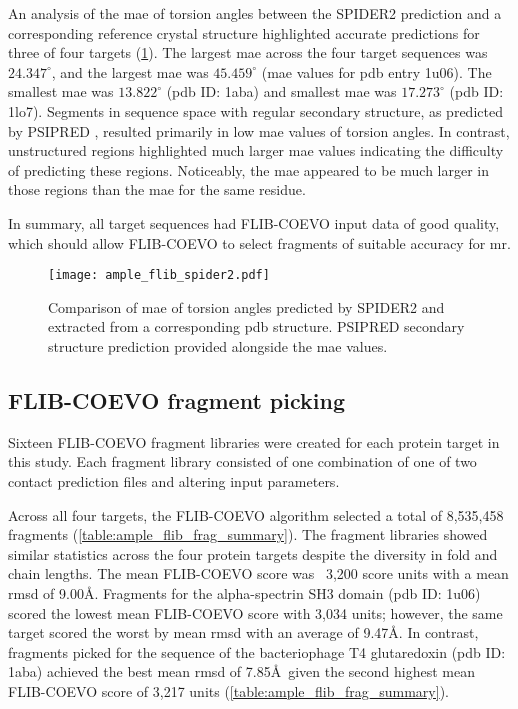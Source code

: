 An analysis of the \gls{mae} of torsion angles between the SPIDER2 \cite{Heffernan2015-bt} prediction and a corresponding reference crystal structure highlighted accurate predictions for three of four targets (\cref{fig:ample_flib_spider2}). The largest \gls{mae}\textsubscript{\textphi} across the four target sequences was $24.347^{\circ}$, and the largest \gls{mae}\textsubscript{\textpsi} was $45.459^{\circ}$ (\gls{mae} values for \gls{pdb} entry 1u06). The smallest \gls{mae}\textsubscript{\textphi} was $13.822^{\circ}$ (\gls{pdb} ID: 1aba) and smallest \gls{mae}\textsubscript{\textpsi} was $17.273^{\circ}$ (\gls{pdb} ID: 1lo7). Segments in sequence space with regular secondary structure, as predicted by PSIPRED \cite{Jones1999-ed}, resulted primarily in low \gls{mae} values of torsion angles. In contrast, unstructured regions highlighted much larger \gls{mae} values indicating the difficulty of predicting these regions. Noticeably, the \gls{mae}\textsubscript{\textpsi} appeared to be much larger in those regions than the \gls{mae}\textsubscript{\textphi} for the same residue.

In summary, all target sequences had FLIB-COEVO input data of good quality, which should allow FLIB-COEVO to select fragments of suitable accuracy for \gls{mr}.

\begin{figure}[H]
	\centering
	\texttt{[image: ample\_flib\_spider2.pdf]}
	\caption[SPIDER2 torsion angle prediction analysis of FLIB-COEVO targets]{Comparison of \gls{mae} of torsion angles predicted by SPIDER2 \cite{Heffernan2015-bt} and extracted from a corresponding \gls{pdb} structure. PSIPRED \cite{Jones1999-ed} secondary structure prediction provided alongside the \gls{mae} values.}
	\label{fig:ample_flib_spider2}
\end{figure}

\subsection{FLIB-COEVO fragment picking}
Sixteen FLIB-COEVO fragment libraries were created for each protein target in this study. Each fragment library consisted of one combination of one of two contact prediction files and altering input parameters.

Across all four targets, the FLIB-COEVO algorithm selected a total of 8,535,458 fragments (\cref{table:ample_flib_frag_summary}). The fragment libraries showed similar statistics across the four protein targets despite the diversity in fold and chain lengths. The mean FLIB-COEVO score was ~3,200 score units with a mean \gls{rmsd} of 9.00\AA. Fragments for the alpha-spectrin SH3 domain (\gls{pdb} ID: 1u06) scored the lowest mean FLIB-COEVO score with 3,034 units; however, the same target scored the worst by mean \gls{rmsd} with an average of 9.47\AA. In contrast, fragments picked for the sequence of the bacteriophage T4 glutaredoxin (\gls{pdb} ID: 1aba) achieved the best mean \gls{rmsd} of 7.85\AA\ given the second highest mean FLIB-COEVO score of 3,217 units (\cref{table:ample_flib_frag_summary}).

